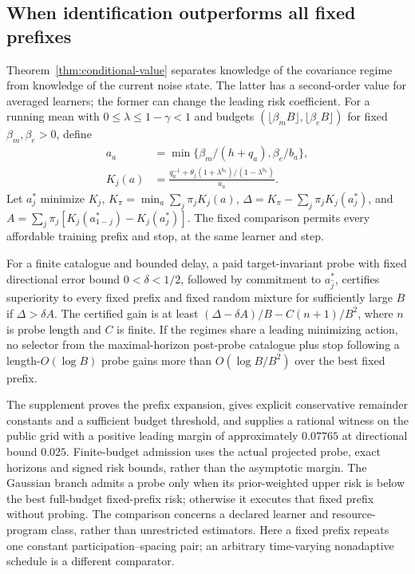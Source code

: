 \subsection{When identification outperforms all fixed prefixes}
Theorem~\ref{thm:conditional-value} separates knowledge of the covariance regime from knowledge of the current noise state.
The latter has a second-order value for averaged learners; the former can change the leading risk coefficient.
For a running mean with $0\le\lambda\le1-\gamma<1$ and budgets $(\lfloor\beta_m B\rfloor,\lfloor\beta_e B\rfloor)$ for fixed $\beta_m,\beta_e>0$, define
\begin{align*}
a_a&=\min\{\beta_m/(h+q_a),\beta_e/b_a\},\\
K_j(a)&=\frac{q_a^{-1}+\theta_j(1+\lambda^{b_a})/(1-\lambda^{b_a})}{a_a}.
\end{align*}
Let $a_j^*$ minimize $K_j$, $K_\pi=\min_a\sum_j\pi_jK_j(a)$,
$\Delta=K_\pi-\sum_j\pi_jK_j(a_j^*)$, and
$A=\sum_j\pi_j[K_j(a_{1-j}^*)-K_j(a_j^*)]$.
The fixed comparison permits every affordable training prefix and stop, at the same learner and step.

\begin{corollary}
For a finite catalogue and bounded delay, a paid target-invariant probe with fixed directional error bound $0<\delta<1/2$, followed by commitment to $a_{\widehat j}^*$, certifies superiority to every fixed prefix and fixed random mixture for sufficiently large $B$ if $\Delta>\delta A$.
The certified gain is at least $(\Delta-\delta A)/B-C(n+1)/B^2$, where $n$ is probe length and $C$ is finite.
If the regimes share a leading minimizing action, no selector from the maximal-horizon post-probe catalogue plus stop following a length-$O(\log B)$ probe gains more than $O(\log B/B^2)$ over the best fixed prefix.
\label{cor:leading-prefix-separation}
\end{corollary}

The supplement proves the prefix expansion, gives explicit conservative remainder constants and a sufficient budget threshold, and supplies a rational witness on the public grid with a positive leading margin of approximately $0.07765$ at directional bound $0.025$.
Finite-budget admission uses the actual projected probe, exact horizons and signed risk bounds, rather than the asymptotic margin.
The Gaussian branch admits a probe only when its prior-weighted upper risk is below the best full-budget fixed-prefix risk; otherwise it executes that fixed prefix without probing.
The comparison concerns a declared learner and resource-program class, rather than unrestricted estimators.
Here a fixed prefix repeats one constant participation--spacing pair; an arbitrary time-varying nonadaptive schedule is a different comparator.


